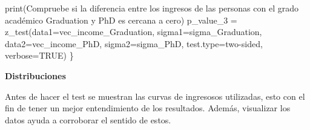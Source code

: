 \documentclass[]{article}
\newenvironment{Shaded}{\begin{snugshade}}{\end{snugshade}}
\newcommand{\AttributeTok}[1]{\textcolor[rgb]{0.77,0.63,0.00}{#1}}
\newcommand{\ConstantTok}[1]{\textcolor[rgb]{0.00,0.00,0.00}{#1}}
\newcommand{\FunctionTok}[1]{\textcolor[rgb]{0.00,0.00,0.00}{#1}}
\newcommand{\NormalTok}[1]{#1}
\newcommand{\OtherTok}[1]{\textcolor[rgb]{0.56,0.35,0.01}{#1}}
\newcommand{\StringTok}[1]{\textcolor[rgb]{0.31,0.60,0.02}{#1}}
\begin{document}
\begin{Shaded}
\begin{Highlighting}[]
  \FunctionTok{print}\NormalTok{(}\StringTok{\textquotesingle{}Compruebe si la diferencia entre los ingresos de las personas con el grado académico \textasciigrave{}Graduation\textasciigrave{} y \textasciigrave{}PhD\textasciigrave{} es cercana a cero\textquotesingle{}}\NormalTok{)}
\NormalTok{  p\_value\_3 }\OtherTok{=} \FunctionTok{z\_test}\NormalTok{(}\AttributeTok{data1=}\NormalTok{vec\_income\_Graduation, }\AttributeTok{sigma1=}\NormalTok{sigma\_Graduation, }\AttributeTok{data2=}\NormalTok{vec\_income\_PhD, }\AttributeTok{sigma2=}\NormalTok{sigma\_PhD, }\AttributeTok{test.type=}\StringTok{\textquotesingle{}two{-}sided\textquotesingle{}}\NormalTok{, }\AttributeTok{verbose=}\ConstantTok{TRUE}\NormalTok{)}
\NormalTok{\}}
\end{Highlighting}
\end{Shaded}

\textbf{Distribuciones}

Antes de hacer el test se muestran las curvas de ingresosos utilizadas,
esto con el fin de tener un mejor entendimiento de los resultados.
Además, visualizar los datos ayuda a corroborar el sentido de estos.
\end{document}

